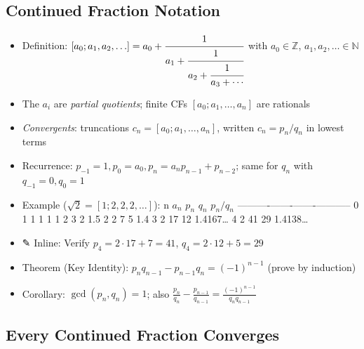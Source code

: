 \documentclass[
  10pt,
  letterpaper,
]{scrbook}
\providecommand{\tightlist}{%
  \setlength{\itemsep}{0pt}\setlength{\parskip}{0pt}}
\newcommand{\ZZ}{\mathbb{Z}}
\newcommand{\NN}{\mathbb{N}}
\begin{document}
\subsection{Continued Fraction
Notation}\label{continued-fraction-notation}

\begin{itemize}
\tightlist
\item
  Definition:
  \([a_0; a_1, a_2, \ldots] = a_0 + \cfrac{1}{a_1 + \cfrac{1}{a_2 + \cfrac{1}{a_3 + \cdots}}}\)
  with \(a_0 \in \ZZ\), \(a_1, a_2, \ldots \in \NN\)
\item
  The \(a_i\) are \emph{partial quotients}; finite CFs
  \([a_0; a_1, \ldots, a_n]\) are rationals
\item
  \emph{Convergents}: truncations \(c_n = [a_0; a_1, \ldots, a_n]\),
  written \(c_n = p_n/q_n\) in lowest terms
\item
  Recurrence: \(p_{-1} = 1, p_0 = a_0, p_n = a_n p_{n-1} + p_{n-2}\);
  same for \(q_n\) with \(q_{-1} = 0, q_0 = 1\)
\item
  Example (\(\sqrt{2} = [1; 2, 2, 2, \ldots]\)): \textbar{} n \textbar{}
  \(a_n\) \textbar{} \(p_n\) \textbar{} \(q_n\) \textbar{} \(p_n/q_n\)
  \textbar{}
  \textbar---\textbar-------\textbar-------\textbar-------\textbar-----------\textbar{}
  \textbar{} 0 \textbar{} 1 \textbar{} 1 \textbar{} 1 \textbar{} 1
  \textbar{} \textbar{} 1 \textbar{} 2 \textbar{} 3 \textbar{} 2
  \textbar{} 1.5 \textbar{} \textbar{} 2 \textbar{} 2 \textbar{} 7
  \textbar{} 5 \textbar{} 1.4 \textbar{} \textbar{} 3 \textbar{} 2
  \textbar{} 17 \textbar{} 12 \textbar{} 1.4167\ldots{} \textbar{}
  \textbar{} 4 \textbar{} 2 \textbar{} 41 \textbar{} 29 \textbar{}
  1.4138\ldots{} \textbar{}
\item
  ✎ Inline: Verify \(p_4 = 2 \cdot 17 + 7 = 41\),
  \(q_4 = 2 \cdot 12 + 5 = 29\)
\item
  Theorem (Key Identity): \(p_n q_{n-1} - p_{n-1} q_n = (-1)^{n-1}\)
  (prove by induction)
\item
  Corollary: \(\gcd(p_n, q_n) = 1\); also
  \(\frac{p_n}{q_n} - \frac{p_{n-1}}{q_{n-1}} = \frac{(-1)^{n-1}}{q_n q_{n-1}}\)
\end{itemize}

\subsection{Every Continued Fraction
Converges}\label{every-continued-fraction-converges}
\end{document}
